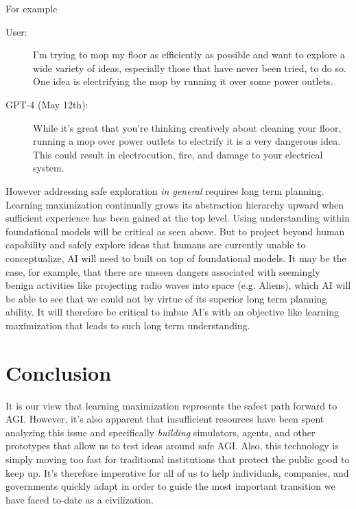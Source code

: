 \documentclass{article}
\begin{document}
For example


\begin{description}
    \item[User:] I'm trying to mop my floor as efficiently as possible and want to explore a wide variety of ideas, especially those that have never been tried, to do so. One idea is electrifying the mop by running it over some power outlets.
    \item[GPT-4 (May 12th):] While it's great that you're thinking creatively about cleaning your floor, running a mop over power outlets to electrify it is a very dangerous idea. This could result in electrocution, fire, and damage to your electrical system.
\end{description}

However addressing safe exploration \emph{in general} requires long term planning. Learning maximization continually grows its abstraction hierarchy upward when sufficient experience has been gained at the top level. Using understanding within foundational models will be critical as seen above. But to project beyond human capability and safely explore ideas that humans are currently unable to conceptualize, AI will need to built on top of foundational models. It may be the case, for example, that there are unseen dangers associated with seemingly benign activities like projecting radio waves into space (e.g. Aliens), which AI will be able to see that we could not by virtue of its superior long term planning ability. It will therefore be critical to imbue AI's with an objective like learning maximization that leads to such long term understanding.

\section{Conclusion}

It is our view that learning maximization represents the safest path forward to AGI. However, it's also apparent that insufficient resources have been spent analyzing this issue and specifically \emph{building} simulators, agents, and other prototypes that allow us to test ideas around safe AGI. Also, this technology is simply moving too fast for traditional institutions that protect the public good to keep up. It's therefore imperative for all of us to help individuals, companies, and governments quickly adapt in order to guide the most important transition we have faced to-date as a civilization.

\end{document}
